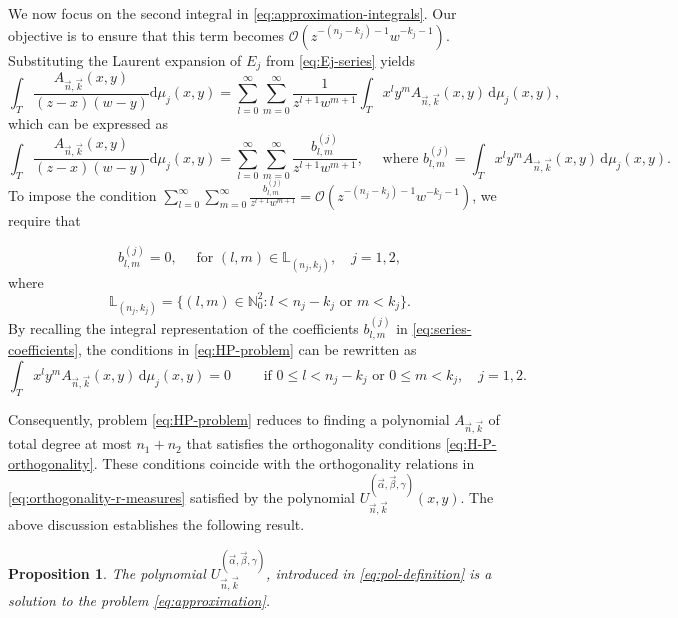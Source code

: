 \documentclass[11pt,reqno]{amsart}
\newtheorem{proposition}[theorem]{Proposition}
\theoremstyle{definition}
\begin{document}
We now focus on the second integral in \eqref{eq:approximation-integrals}. Our objective is to ensure that this term becomes $\mathcal{O}(z^{-(n_j-k_j)-1}w^{-k_j-1})$. Substituting the Laurent expansion of $E_j$ from \eqref{eq:Ej-series} yields
$$
\int_{T} \frac{A_{\vec n,\vec k}(x,y) }{(z-x)(w-y)} \mathrm{d} \mu_j (x,y) = \sum_{l=0}^{\infty} \sum_{m=0}^{\infty} \frac{1}{z^{l+1} w^{m+1}}\int_T x^l y^m A_{\vec n,\vec k}(x,y)\,\mathrm{d} \mu_j(x,y),
$$
which can be expressed as
\begin{equation}
    \label{eq:series-coefficients}
    \int_{T} \frac{A_{\vec n,\vec k}(x,y) }{(z-x)(w-y)} \mathrm{d} \mu_j (x,y) =\sum_{l=0}^{\infty} \sum_{m=0}^{\infty} \frac{b_{l,m}^{(j)}}{z^{l+1} w^{m+1}}, \quad \text{ where } b_{l,m}^{(j)}=\int_T x^l y^m A_{\vec n,\vec k}(x,y)\,\mathrm{d} \mu_j(x,y).
\end{equation}
To impose the condition $\displaystyle\sum_{l=0}^{\infty} \sum_{m=0}^{\infty} \frac{b_{l,m}^{(j)}}{z^{l+1} w^{m+1}}=\mathcal{O}(z^{-(n_j-k_j)-1}w^{-k_j-1})$, we require that \citep[Problem 1]{Sor02}

\begin{equation}
    \label{eq:HP-problem}
    b_{l,m}^{(j)} = 0, \quad \text{ for } (l,m)\in \mathbb L_{(n_j,k_j)},\quad j=1,2,
\end{equation}
where
$$
\mathbb L_{(n_j,k_j)} = \{(l,m) \in \mathbb N_0^2: l<n_j-k_j \text{ or } m<k_j\}.
$$
By recalling the integral representation of the coefficients $b_{l,m}^{(j)}$ in \eqref{eq:series-coefficients}, the conditions in \eqref{eq:HP-problem} can be rewritten as
\begin{equation}
    \label{eq:H-P-orthogonality}
    \int_T x^l y^m A_{\vec n,\vec k}(x,y)\,\mathrm{d} \mu_j(x,y) = 0\qquad \text{ if } 0\leq l < n_j-k_j \text{ or } 0\leq m< k_j,\quad j=1,2.
\end{equation}

Consequently, problem \eqref{eq:HP-problem} reduces to finding a polynomial $A_{\vec n,\vec k}$ of total degree at most $n_1+n_2$ that satisfies the orthogonality conditions \eqref{eq:H-P-orthogonality}. These conditions coincide with the orthogonality relations in \eqref{eq:orthogonality-r-measures} satisfied by the polynomial $U_{\vec n,\vec k}^{(\vec \alpha,\vec \beta,\gamma)}(x,y)$. The above discussion establishes the following result.

\begin{proposition}\label{prop:denominator}
    The polynomial $U_{\vec n,\vec k}^{(\vec \alpha,\vec \beta,\gamma)}$, introduced in \eqref{eq:pol-definition} is a solution to the problem \eqref{eq:approximation}.
\end{proposition}
\end{document}
